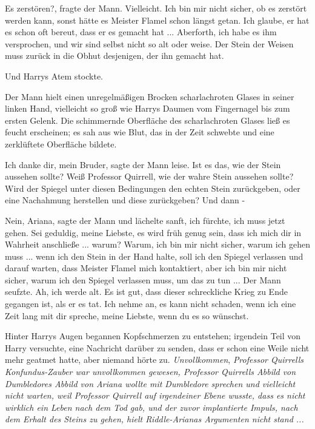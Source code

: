 \glqq{}Es zerstören?\grqq{}, fragte der Mann. \glqq{}Vielleicht. Ich bin mir nicht
sicher, ob es zerstört werden kann, sonst hätte es Meister Flamel schon längst
getan. Ich glaube, er hat es schon oft bereut, dass er es gemacht hat ...
Aberforth, ich habe es ihm versprochen, und wir sind selbst nicht so alt oder
weise. Der Stein der Weisen muss zurück in die Obhut desjenigen, der ihn gemacht
hat.\grqq{}

Und Harrys Atem stockte.

Der Mann hielt einen unregelmäßigen Brocken scharlachroten Glases in seiner
linken Hand, vielleicht so groß wie Harrys Daumen vom Fingernagel bis zum ersten
Gelenk. Die schimmernde Oberfläche des scharlachroten Glases ließ es feucht
erscheinen; es sah aus wie Blut, das in der Zeit schwebte und eine zerklüftete
Oberfläche bildete.

\glqq{}Ich danke dir, mein Bruder\grqq{}, sagte der Mann leise. Ist es das, wie
der Stein aussehen sollte? Weiß Professor Quirrell, wie der wahre Stein aussehen
sollte? Wird der Spiegel unter diesen Bedingungen den echten Stein zurückgeben,
oder eine Nachahmung herstellen und diese zurückgeben? Und dann -

\glqq{}Nein, Ariana\grqq{}, sagte der Mann und lächelte sanft, \glqq{}ich fürchte,
ich muss jetzt gehen. Sei geduldig, meine Liebste, es wird früh genug sein, dass
ich mich dir in Wahrheit anschließe ... warum? Warum, ich bin mir nicht sicher,
warum ich gehen muss ... wenn ich den Stein in der Hand halte, soll ich den
Spiegel verlassen und darauf warten, dass Meister Flamel mich kontaktiert, aber
ich bin mir nicht sicher, warum ich den Spiegel verlassen muss, um das zu
tun ...\grqq{} Der Mann seufzte. \glqq{}Ah, ich werde alt. Es ist gut, dass dieser
schreckliche Krieg zu Ende gegangen ist, als er es tat. Ich nehme an, es kann
nicht schaden, wenn ich eine Zeit lang mit dir spreche, meine Liebste, wenn du
es so wünschst.\grqq{}

Hinter Harrys Augen begannen Kopfschmerzen zu entstehen; irgendein Teil von
Harry versuchte, eine Nachricht darüber zu senden, dass er schon eine Weile
nicht mehr geatmet hatte, aber niemand hörte zu. \emph{Unvollkommen},
\emph{Professor Quirrells Konfundus-Zauber war unvollkommen gewesen, Professor
Quirrells Abbild von Dumbledores Abbild von Ariana wollte mit Dumbledore
sprechen und vielleicht nicht warten, weil Professor Quirrell auf irgendeiner
Ebene wusste, dass es nicht wirklich ein Leben nach dem Tod gab, und der zuvor
implantierte Impuls, nach dem Erhalt des Steins zu gehen, hielt Riddle-Arianas
Argumenten nicht stand ...}

